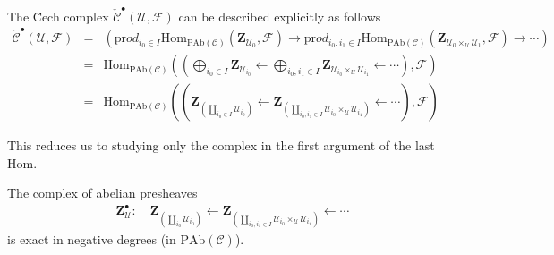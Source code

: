   \begin{lemma}
  The \u Cech complex $\check{\mathcal{C}}^\bullet(\mathcal{U}, \mathcal{F})$ can be described explicitly as follows
\begin{eqnarray*}
   \check{\mathcal{C}}^\bullet(\mathcal{U}, \mathcal{F})  
   & = &
   \left(\text{pr}od_{i_0\in I}\text{Hom}_{\text{PAb}(\mathcal{C})}(\mathbf{Z}_{\mathcal{U}_0}, \mathcal{F})\to \text{pr}od_{i_0, i_1 \in I} \text{Hom}_{\text{PAb}(\mathcal{C})}\left(\mathbf{Z}_{\mathcal{U}_0\times_\mathcal{U} \mathcal{U}_1}, \mathcal{F}\right) \to \cdots\right)\\ 
   & = & \text{Hom}_{\text{PAb}(\mathcal{C})} \left(\left(\displaystyle \bigoplus_{i_0\in I} \mathbf{Z}_{\mathcal{U}_{i_0}}\leftarrow \bigoplus_{i_0, i_1\in I} \mathbf{Z}_{\mathcal{U}_{i_0}\times_\mathcal{U} \mathcal{U}_{i_1}} \leftarrow \cdots\right), \mathcal{F}\right) \\ 
   & = & \text{Hom}_{\text{PAb}(\mathcal{C})}\left(\left(\mathbf{Z}_{(\coprod_{i_0\in I} \mathcal{U}_{i_0})}\leftarrow \mathbf{Z}_{(\coprod_{i_0, i_1\in I} \mathcal{U}_{i_0}\times_\mathcal{U} \mathcal{U}_{i_1})}\leftarrow \cdots\right),\mathcal{F}\right) 
\end{eqnarray*}
  \end{lemma}
  
  This reduces us to studying only the complex in the first argument of the last $\text{Hom}$.
  
 \begin{lemma}
 The complex of abelian presheaves
 \begin{align*}
 \mathbf{Z}_{\mathcal{U}}^\bullet :  \quad \mathbf{Z}_{(\coprod_{i_0} \mathcal{U}_{i_0})} \leftarrow \mathbf{Z}_{(\coprod_{i_0, i_1\in I} \mathcal{U}_{i_0}\times_\mathcal{U} \mathcal{U}_{i_1})}\leftarrow \cdots 
 \end{align*}
 is exact in negative degrees (in $\text{PAb}(\mathcal{C})$).
  \end{lemma}
  
